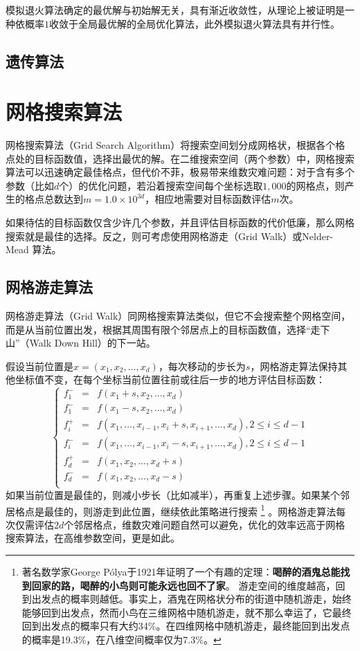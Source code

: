 模拟退火算法确定的最优解与初始解无关，具有渐近收敛性，从理论上被证明是一种依概率$1$收敛于全局最优解的全局优化算法，此外模拟退火算法具有并行性。

\subsection{遗传算法}

\section{网格搜索算法}
网格搜索算法（Grid Search Algorithm）将搜索空间划分成网格状，根据各个格点处的目标函数值，选择出最优的解。在二维搜索空间（两个参数）中，网格搜索算法可以迅速确定最佳格点，但代价不菲，极易带来维数灾难问题：对于含有多个参数（比如$d$个）的优化问题，若沿着搜索空间每个坐标选取$1,000$的网格点，则产生的格点总数达到$m=1.0\times 10^{3d}$，相应地需要对目标函数评估$m$次。

如果待估的目标函数仅含少许几个参数，并且评估目标函数的代价低廉，那么网格搜索就是最佳的选择。反之，则可考虑使用网格游走（Grid Walk）或Nelder-Mead 算法。

\subsection{网格游走算法}
网格游走算法（Grid Walk）同网格搜索算法类似，但它不会搜索整个网格空间，而是从当前位置出发，根据其周围有限个邻居点上的目标函数值，选择“走下山”（Walk Down Hill）的下一站。

假设当前位置是$x=(x_1,x_2,\ldots, x_d)$，每次移动的步长为$s$，网格游走算法保持其他坐标值不变，在每个坐标当前位置往前或往后一步的地方评估目标函数：
\begin{equation}
    \left\{
    \begin{array}{lll}
      f_1^{-} & = & f(x_1 + s, x_2,\ldots, x_d) \\
      f_1^{-} & = & f(x_1 - s, x_2,\ldots, x_d) \\
      f_i^{+} & = & f(x_1, \ldots, x_{i-1}, x_i + s, x_{i+1}, \ldots, x_d), 2\le i \le d-1 \\
      f_i^{-} & = & f(x_1, \ldots, x_{i-1}, x_i - s, x_{i+1}, \ldots, x_d), 2\le i \le d-1 \\
      f_d^{+} & = & f(x_1, x_2,\ldots, x_d + s) \\
      f_d^{-} & = & f(x_1, x_2,\ldots, x_d - s) \\
    \end{array}
    \right.
\end{equation}
如果当前位置是最佳的，则减小步长（比如减半），再重复上述步骤。如果某个邻居格点是最佳的，则游走到此位置，继续依此策略进行搜索
\footnote{著名数学家George P\'{o}lya于1921年证明了一个有趣的定理：\textbf{喝醉的酒鬼总能找到回家的路，喝醉的小鸟则可能永远也回不了家}。
游走空间的维度越高，回到出发点的概率则越低。事实上，酒鬼在网格状分布的街道中随机游走，始终能够回到出发点，然而小鸟在三维网格中随机游走，就不那么幸运了，它最终回到出发点的概率只有大约34\%。在四维网格中随机游走，最终能回到出发点的概率是19.3\%，在八维空间概率仅为7.3\%。}
。网格游走算法每次仅需评估$2d$个邻居格点，维数灾难问题自然可以避免，优化的效率远高于网格搜索算法，在高维参数空间，更是如此。

